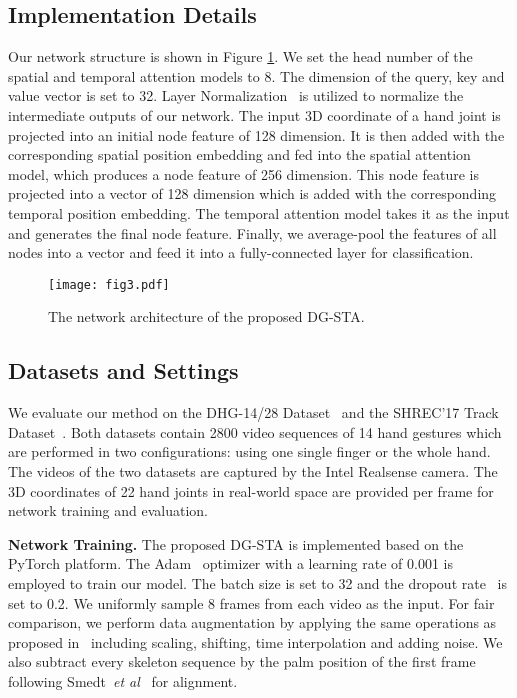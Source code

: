 \documentclass{bmvc2k}
\def\etal{\emph{et al}\bmvaOneDot}
\begin{document}
\subsection{Implementation Details}
\label{sec:arch}

Our network structure is shown in Figure \ref{fig:arch}. We set the head number of the spatial and temporal attention models to 8. The dimension  of the query, key and value vector is set to 32. Layer Normalization~\cite{ln} is utilized to normalize the intermediate outputs of our network. The input 3D coordinate of a hand joint is projected into an initial node feature of 128 dimension. It is then added with the corresponding spatial position embedding and fed into the spatial attention model, which produces a node feature of 256 dimension. This node feature is projected into a vector of 128 dimension which is added with the corresponding temporal position embedding. The temporal attention model takes it as the input and generates the final node feature. Finally, we average-pool the features of all nodes into a vector and feed it into a fully-connected layer for classification.

\begin{figure}[h]
\texttt{[image: fig3.pdf]}
\caption{The network architecture of the proposed DG-STA.}
\label{fig:arch}
\end{figure}

\subsection{Datasets and Settings}
\label{sec:settings}

We evaluate our method on the DHG-14/28 Dataset~\cite{de2016skeleton} and the SHREC'17 Track Dataset~\cite{de2017shrec}. Both datasets contain 2800 video sequences of 14 hand gestures which are performed in two configurations: using one single finger or the whole hand. The videos of the two datasets are captured by the Intel Realsense camera. The 3D coordinates of 22 hand joints in real-world space are provided per frame for network training and evaluation.

\textbf{Network Training.}
The proposed DG-STA is implemented based on the PyTorch platform. The Adam~\cite{kingma2014adam} optimizer with a learning rate of 0.001 is employed to train our model. The batch size is set to 32 and the dropout rate~\cite{srivastava2014dropout} is set to 0.2. We uniformly sample 8 frames from each video as the input. For fair comparison, we perform data augmentation by applying the same operations as proposed in~\cite{de2017shrec,nunez2018convolutional} including scaling, shifting, time interpolation and adding noise. We also subtract every skeleton sequence by the palm position of the first frame following Smedt~\etal~\cite{de2017shrec} for alignment.
\end{document}
